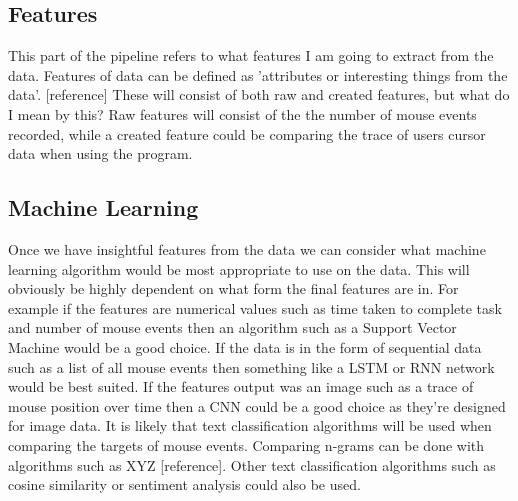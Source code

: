 \documentclass{article}
\begin{document}

\subsection{Features}




This part of the pipeline refers to what features I am going to extract from the data.
Features of data can be defined as 'attributes or interesting things from the data'. [reference]
These will consist of both raw and created features, but what do I mean by this?
Raw features will consist of the the number of mouse events recorded, while a created feature could be comparing the trace of users cursor data when using the program.

\subsection{Machine Learning}


Once we have insightful features from the data we can consider what machine learning algorithm would be most appropriate to use on the data.
This will obviously be highly dependent on what form the final features are in.
For example if the features are numerical values such as time taken to complete task and number of mouse events then an algorithm such as a Support Vector Machine would be a good choice.
If the data is in the form of sequential data such as a list of all mouse events then something like a LSTM or RNN network would be best suited.
If the features output was an image such as a trace of mouse position over time then a CNN could be a good choice as they're designed for image data.
It is likely that text classification algorithms will be used when comparing the targets of mouse events.
Comparing n-grams can be done with algorithms such as XYZ [reference].
Other text classification algorithms such as cosine similarity or sentiment analysis could also be used.
\end{document}
